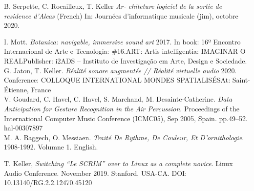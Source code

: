 \documentclass[journal,onecolumn]{IEEEtran}
\begin{document}
\begin{thebibliography}{1}
B. Serpette, C. Rocailleux, T. Keller \emph{Ar-
chiteture logiciel de la sortie de residence d’Aleas} (French)
In: Journées d’informatique musicale (jim), octobre 2020.

I. Mott. \emph{Botanica: navigable, immersive sound art} 
2017. In book: 16º Encontro Internacional de Arte e Tecnologia: \#16.ART: Artis intelligentia: IMAGINAR O REALPublisher: i2ADS – Instituto de Investigação em Arte, Design e Sociedade. \\

G. Jaton, T. Keller. \emph{Réalité sonore augmentée // Réalité virtuelle audio} 2020. Conference: COLLOQUE INTERNATIONAL MONDES SPATIALISÉSAt: Saint-Étienne, France \\

V. Goudard, C. Havel, C. Havel, S. Marchand, M. Desainte-Catherine. \emph{Data Anticipation for Gesture Recognition in the Air Percussion}. Proceedings of the International Computer Music Conference (ICMC05), Sep 2005, Spain. pp.49–52. hal-00307897 \\

M. A. Baggech, O. Messiaen. \emph{Traité De Rythme, De Couleur, Et D'ornithologie}. 1908-1992. Volumne 1. English.

T. Keller,  \emph{Switching ``Le SCRIM'' over to Linux as a complete novice}. Linux Audio Conference. November 2019. Stanford, USA-CA. DOI: 10.13140/RG.2.2.12470.45120

\end{thebibliography}

% 


\end{document}
